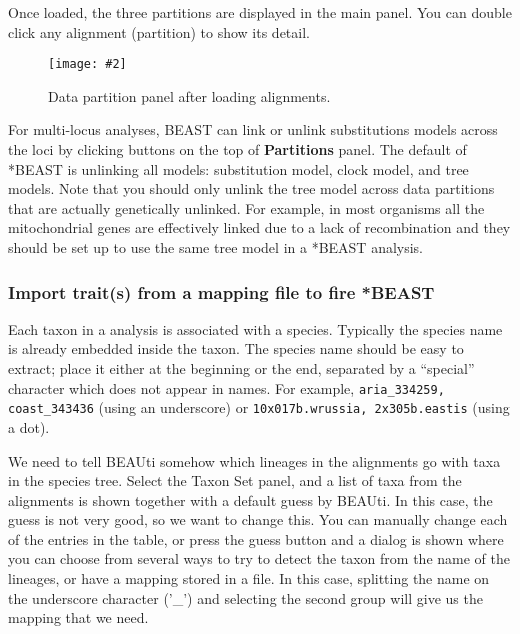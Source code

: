 \documentclass{article}
\newcommand{\includeimage}[2][]{%
\texttt{[image: \#2]}
}
\begin{document}
\medskip{}

Once loaded, the three partitions are displayed in the main panel.
You can double click any alignment (partition) to show its detail.

\begin{figure}
\centering
\includeimage[scale=0.32,clip=true,trim=0 300 0 0]{figures/BEAUti_DataPartitions}

\caption{\label{fig.datapartition} Data partition panel after loading alignments.}
\end{figure}


For multi-locus analyses, BEAST can link or unlink substitutions models across the loci by clicking buttons on the top of {\bf Partitions} panel. The default of *BEAST is unlinking all models: substitution model, clock model, and tree models. Note that you should only unlink the tree model across data partitions that are actually genetically unlinked. For example, in most organisms all the mitochondrial genes are effectively linked due to a lack of recombination and they should be set up to use the same tree model in a *BEAST analysis. 

\subsubsection*{Import trait(s) from a mapping file to fire *BEAST}

Each taxon in a \mlstname{} analysis is associated with a species. Typically the
species name is already embedded inside the taxon. The species name should be
easy to extract; place it either at the beginning or the end, separated by a
``special'' character which does not appear in names. For example,
\texttt{aria\_334259, coast\_343436} (using an underscore) or
\texttt{10x017b.wrussia, 2x305b.eastis} (using a dot).

We need to tell BEAUti somehow which lineages in the alignments go with taxa in the species tree. Select the Taxon Set panel, and a list of taxa from the alignments is shown together with a default guess by BEAUti. In this case, the guess is not very good, so we want to change this. You can manually change each of the entries in the table, or press the guess button and a dialog is shown where you can choose from several ways to try to detect the taxon from the name of the lineages, or have a mapping stored in a file. In this case, splitting the name on the underscore character ('\_') and selecting the second group will give us the mapping that we need.
\end{document}
